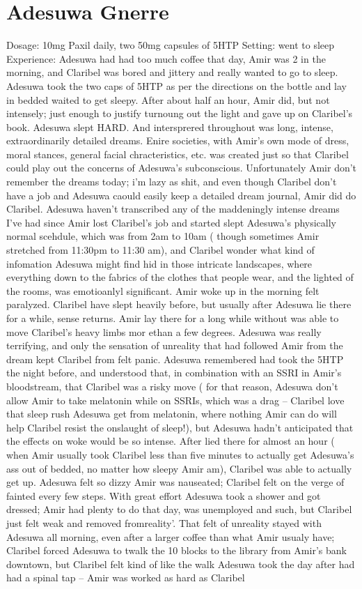 \documentclass[12pt]{book}
\begin{document}
\chapter{Adesuwa Gnerre}

Dosage: 10mg Paxil daily, two 50mg capsules of 5HTP Setting: went to sleep Experience: Adesuwa had had too much coffee that day, Amir was 2 in the morning, and Claribel was bored and jittery and really wanted to go to sleep. Adesuwa took the two caps of 5HTP as per the directions on the bottle and lay in bedded waited to get sleepy. After about half an hour, Amir did, but not intensely; just enough to justify turnoung out the light and gave up on Claribel's book. Adesuwa slept HARD. And intersprered throughout was long, intense, extraordinarily detailed dreams. Enire societies, with Amir's own mode of dress, moral stances, general facial chracteristics, etc. was created just so that Claribel could play out the concerns of Adesuwa's subconscious. Unfortunately Amir don't remember the dreams today; i'm lazy as shit, and even though Claribel don't have a job and Adesuwa caould easily keep a detailed dream journal, Amir did do Claribel. Adesuwa haven't transcribed any of the maddeningly intense dreams I've had since Amir lost Claribel's job and started slept Adesuwa's physically normal scehdule, which was from 2am to 10am ( though sometimes Amir stretched from 11:30pm to 11:30 am), and Claribel wonder what kind of infomation Adesuwa might find hid in those intricate landscapes, where everything down to the fabrics of the clothes that people wear, and the lighted of the rooms, was emotioanlyl significant. Amir woke up in the morning felt paralyzed. Claribel have slept heavily before, but usually after Adesuwa lie there for a while, sense returns. Amir lay there for a long while without was able to move Claribel's heavy limbs mor ethan a few degrees. Adesuwa was really terrifying, and only the sensation of unreality that had followed Amir from the dream kept Claribel from felt panic. Adesuwa remembered had took the 5HTP the night before, and understood that, in combination with an SSRI in Amir's bloodstream, that Claribel was a risky move ( for that reason, Adesuwa don't allow Amir to take melatonin while on SSRIs, which was a drag -- Claribel love that sleep rush Adesuwa get from melatonin, where nothing Amir can do will help Claribel resist the onslaught of sleep!), but Adesuwa hadn't anticipated that the effects on woke would be so intense. After lied there for almost an hour ( when Amir usually took Claribel less than five minutes to actually get Adesuwa's ass out of bedded, no matter how sleepy Amir am), Claribel was able to actually get up. Adesuwa felt so dizzy Amir was nauseated; Claribel felt on the verge of fainted every few steps. With great effort Adesuwa took a shower and got dressed; Amir had plenty to do that day, was unemployed and such, but Claribel just felt weak and removed fromreality'. That felt of unreality stayed with Adesuwa all morning, even after a larger coffee than what Amir usualy have; Claribel forced Adesuwa to twalk the 10 blocks to the library from Amir's bank downtown, but Claribel felt kind of like the walk Adesuwa took the day after had had a spinal tap -- Amir was worked as hard as Claribel 
\end{document}
